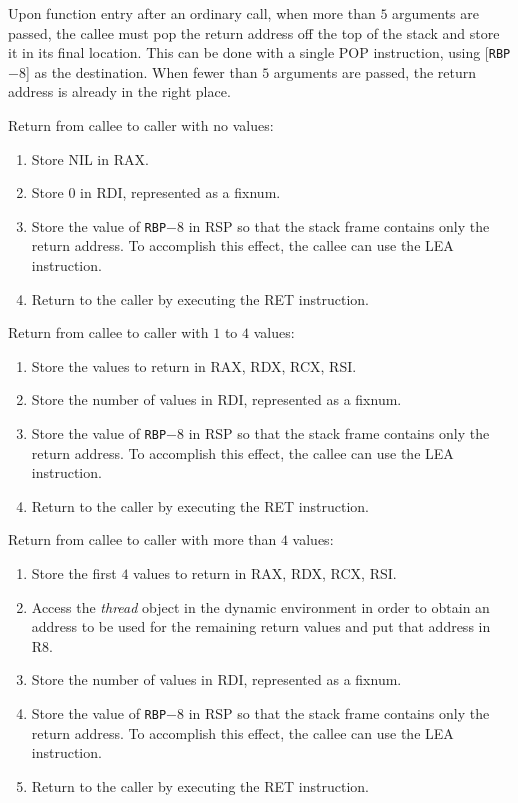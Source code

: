 Upon function entry after an ordinary call, when more than $5$
arguments are passed, the callee must pop the return address off the
top of the stack and store it in its final location.  This can be done
with a single POP instruction, using [\texttt{RBP}$ - 8$] as the
destination.  When fewer than $5$ arguments are passed, the return
address is already in the right place.

Return from callee to caller with no values:

\begin{enumerate}
\item Store NIL in RAX.
\item Store $0$ in RDI, represented as a fixnum.
\item Store the value of \texttt{RBP}$ - 8$ in RSP so that the stack frame
  contains only the return address.  To accomplish this effect, the
  callee can use the LEA instruction.
\item Return to the caller by executing the RET instruction.
\end{enumerate}

Return from callee to caller with $1$ to $4$ values:

\begin{enumerate}
\item Store the values to return in RAX, RDX, RCX, RSI.
\item Store the number of values in RDI, represented as a fixnum.
\item Store the value of \texttt{RBP}$ - 8$ in RSP so that the stack frame
  contains only the return address.  To accomplish this effect, the
  callee can use the LEA instruction.
\item Return to the caller by executing the RET instruction.
\end{enumerate}

Return from callee to caller with more than $4$ values:

\begin{enumerate}
\item Store the first $4$ values to return in RAX, RDX, RCX, RSI.
\item Access the \emph{thread} object in the dynamic environment in
  order to obtain an address to be used for the remaining return
  values and put that address in R8.
\item Store the number of values in RDI, represented as a fixnum.
\item Store the value of \texttt{RBP}$ - 8$ in RSP so that the stack frame
  contains only the return address.  To accomplish this effect, the
  callee can use the LEA instruction.
\item Return to the caller by executing the RET instruction.
\end{enumerate}

